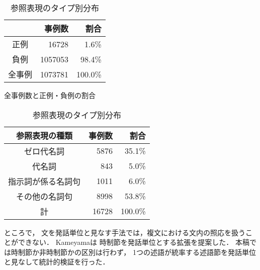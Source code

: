 \begin{table}
\begin{center}
\begin{tabular}{|c|r|r|}
\hline
&事例数&割合\\
\hline\hline
正例&16728&1.6\%\\
負例&1057053&98.4\%\\
\hline
全事例&1073781&100.0\%\\
\hline
\end{tabular}
\end{center}
\caption{全事例数と正例・負例の割合}
\label{tab:examples}

\begin{center}
\begin{tabular}{|c|r|r|}
\hline
参照表現の種類&事例数&割合\\
\hline\hline
ゼロ代名詞&5876&35.1\%\\
代名詞&843&5.0\%\\
指示詞が係る名詞句&1011&6.0\%\\
その他の名詞句&8998&53.8\%\\
\hline
計&16728&100.0\%\\
\hline
\end{tabular}
\end{center}
\caption{参照表現のタイプ別分布}
\label{tab:anaphors}
\end{table}


ところで，
文を発話単位と見なす手法では，複文における文内の照応を扱うことができない．
Kameyama\citeyear{kameyama1998}は
時制節を発話単位とする拡張を提案した．
本稿では時制節か非時制節かの区別は行わず，
1つの述語が統率する述語節を発話単位と見なして統計的検証を行った．


